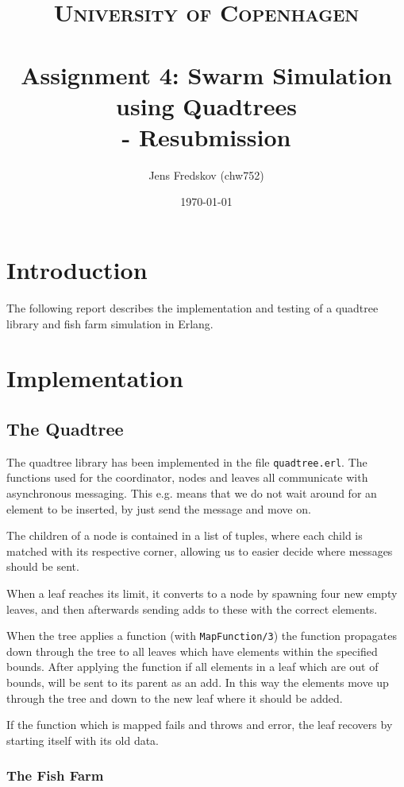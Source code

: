 \documentclass[a4paper, 11pt]{article}
\title{ 
\normalfont\normalsize 
\textsc{University of Copenhagen} \\ [25pt] %
\horrule{0.5pt} \\[0.4cm] %
\huge Assignment 4: Swarm Simulation using Quadtrees\\ \Large - Resubmission %
\horrule{2pt} \\[0.5cm] %
}
\author{Jens Fredskov (chw752)} %
\date{\normalsize\today} %
\begin{document}
\maketitle

\section{Introduction} %
\label{sec:introduction}

The following report describes the implementation and testing of a quadtree library and fish farm simulation in Erlang.

\section{Implementation} %
\label{sec:implementation}

\subsection{The Quadtree} %
\label{sub:the_quadtree}

The quadtree library has been implemented in the file \texttt{quadtree.erl}. The functions used for the coordinator, nodes and leaves all communicate with asynchronous messaging. This e.g. means that we do not wait around for an element to be inserted, by just send the message and move on.

The children of a node is contained in a list of tuples, where each child is matched with its respective corner, allowing us to easier decide where messages should be sent.

When a leaf reaches its limit, it converts to a node by spawning four new empty leaves, and then afterwards sending adds to these with the correct elements.

When the tree applies a function (with \texttt{MapFunction/3}) the function propagates down through the tree to all leaves which have elements within the specified bounds. After applying the function if all elements in a leaf which are out of bounds, will be sent to its parent as an add. In this way the elements move up through the tree and down to the new leaf where it should be added.

If the function which is mapped fails and throws and error, the leaf recovers by starting itself with its old data.

\subsubsection{The Fish Farm} %
\label{ssub:the_fish_farm}
\end{document}
